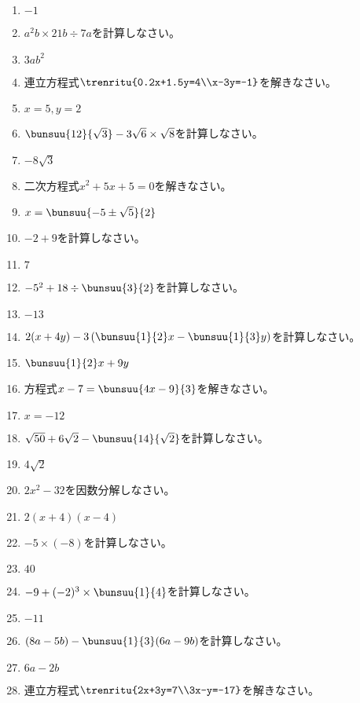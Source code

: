 \documentclass[uplatex,a4j,11pt]{jsreport}
\begin{document}
\begin{multicols}{2}
\begin{enumerate}
    \item $-1$
    \item $a^2b\times21b\div 7a$\quad を計算しなさい。%
    \item $3ab^2$
    \item 連立方程式\quad$\trenritu{0.2x+1.5y=4\\x-3y=-1}$\quad を解きなさい。%
    \item $x=5, y=2$
    \item $\bunsuu{12}{\sqrt{3}}-3\sqrt{6}\times \sqrt{8}$\quad を計算しなさい。%
    \item $-8\sqrt{3}$
    \item 二次方程式\quad$x^2+5x+5=0$\quad を解きなさい。%
    \item $x = \bunsuu{-5\pm\sqrt{5}}{2}$
    \item $-2+9$\quad を計算しなさい。%
    \item $7$
    \item $-5^2+18\div \bunsuu{3}{2}$\quad を計算しなさい。%
    \item $-13$
    \item $2(x+4y)-3\left(\bunsuu{1}{2}x-\bunsuu{1}{3}y\right)$\quad を計算しなさい。%
    \item $\bunsuu{1}{2}x+9y$
    \item 方程式\quad$x-7=\bunsuu{4x-9}{3}$\quad を解きなさい。%
    \item $x=-12$
    \item $\sqrt{50}+6\sqrt{2}-\bunsuu{14}{\sqrt{2}}$\quad を計算しなさい。%
    \item $4\sqrt{2}$
    \item $2x^2-32$\quad を因数分解しなさい。%
    \item $2(x+4)(x-4)$
    \item $-5\times (-8)$\quad を計算しなさい。%
    \item $40$
    \item $-9+(-2)^3\times \bunsuu{1}{4}$\quad を計算しなさい。%
    \item $-11$
    \item $(8a-5b)-\bunsuu{1}{3}(6a-9b)$\quad を計算しなさい。%
    \item $6a-2b$
    \item 連立方程式\quad$\trenritu{2x+3y=7\\3x-y=-17}$\quad を解きなさい。%

\end{enumerate}
\end{multicols}
\end{document}
